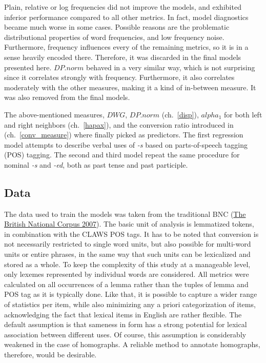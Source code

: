 \documentclass[
]{article}
\begin{document}
Plain, relative or log frequencies did not improve the models, and
exhibited inferior performance compared to all other metrics. In fact,
model diagnostics became much worse in some cases. Possible reasons are
the problematic distributional properties of word frequencies, and low
frequency noise. Furthermore, frequency influences every of the
remaining metrics, so it is in a sense heavily encoded there. Therefore,
it was discarded in the final models presented here. \(DP.norm\) behaved
in a very similar way, which is not surprising since it correlates
strongly with frequency. Furthermore, it also correlates moderately with
the other measures, making it a kind of in-between measure. It was also
removed from the final models.

The above-mentioned measures, \(DWG\), \(DP.norm\) (ch.~\ref{disp}),
\(alpha_{1}\) for both left and right neighbors (ch.~\ref{hapax}), and
the conversion ratio introduced in (ch.~\ref{conv_measure}) where
finally picked as predictors. The first regression model attempts to
describe verbal uses of \emph{-s} based on parts-of-speech tagging (POS)
tagging. The second and third model repeat the same procedure for
nominal \emph{-s} and \emph{-ed}, both as past tense and past
participle.

\hypertarget{data}{%
\subsection{Data}\label{data}}

The data used to train the models was taken from the traditional BNC
(\protect\hyperlink{ref-bnc}{The British National Corpus 2007}). The
basic unit of analysis is lemmatized tokens, in combination with the
CLAWS POS tags. It has to be noted that conversion is not necessarily
restricted to single word units, but also possible for multi-word units
or entire phrases, in the same way that such units can be lexicalized
and stored as a whole. To keep the complexity of this study at a
manageable level, only lexemes represented by individual words are
considered. All metrics were calculated on all occurrences of a lemma
rather than the tuples of lemma and POS tag as it is typically done.
Like that, it is possible to capture a wider range of statistics per
item, while also minimizing any a priori categorization of items,
acknowledging the fact that lexical items in English are rather
flexible. The default assumption is that sameness in form has a strong
potential for lexical association between different uses. Of course,
this assumption is considerably weakened in the case of homographs. A
reliable method to annotate homographs, therefore, would be desirable.
\end{document}
